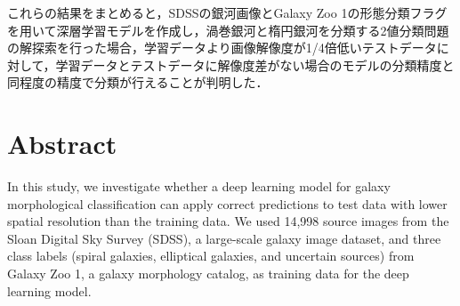 \documentclass[a4j, 11pt]{jreport}
\begin{document}
これらの結果をまとめると，SDSSの銀河画像とGalaxy Zoo 1の形態分類フラグを用いて深層学習モデルを作成し，渦巻銀河と楕円銀河を分類する2値分類問題の解探索を行った場合，学習データより画像解像度が1/4倍低いテストデータに対して，学習データとテストデータに解像度差がない場合のモデルの分類精度と同程度の精度で分類が行えることが判明した．







\chapter*{Abstract}
In this study, we investigate whether a deep learning model for galaxy morphological classification can apply correct predictions to test data with lower spatial resolution than the training data. We used 14,998 source images from the Sloan Digital Sky Survey (SDSS), a large-scale galaxy image dataset, and three class labels (spiral galaxies, elliptical galaxies, and uncertain sources) from Galaxy Zoo 1, a galaxy morphology catalog, as training data for the deep learning model. 
\end{document}
